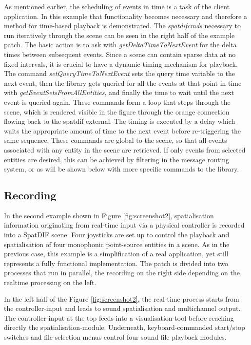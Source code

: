 \documentclass{article}
\begin{document}
As mentioned earlier, the scheduling of events in time is a task of the client application. 
In this example that functionality becomes necessary and therefore a method for time-based playback is demonstrated.
The \emph{spatdifcmds} necessary to run iteratively through the scene can be seen in the right half of the example patch.
The basic action is to ask with \emph{getDeltaTimeToNextEvent} for the delta times between subsequent events.
Since a scene can contain sparse data at no fixed intervals, it is crucial to have a dynamic timing mechanism for playback.
The command \emph{setQueryTimeToNextEvent} sets the query time variable to the next event, then the library gets queried for all the events at that point in time with \emph{getEventSetsFromAllEntities}, and finally the time to wait until the next event is queried again.
These commands form a loop that steps through the scene, which is rendered visible in the figure through the orange connection flowing back to the spatdif external.
The timing is executed by a delay which waits the appropriate amount of time to the next event before re-triggering the same sequence.
These commands are global to the scene, so that all events associated with any entity in the scene are retrieved.
If only events from selected entities are desired, this can be achieved by filtering in the message routing system, or as will be shown below with more specific commands to the library. %

\subsection{Recording}\label{subsec:recording}

In the second example shown in Figure \ref{fig:screenshot2}, spatialisation information originating from real-time input via a physical controller is recorded into a SpatDIF scene.
Four joysticks are set up to control the playback and spatialisation of four monophonic point-source entities in a scene.
As in the previous case, this example is a simplification of a real application, yet still represents a fully functional implementation.
The patch is divided into two processes that run in parallel, the recording on the right side depending on the
realtime processing on the left.
 
In the left half of the Figure \ref{fig:screenshot2}, the real-time process starts from the controller-input and leads to sound spatialisation and multichannel output.
The controller-input at the top feeds into a visualisation-tool before reaching directly the spatialisation-module.
Underneath, keyboard-commanded start/stop switches and file-selection menus control four sound file playback modules.
\end{document}
